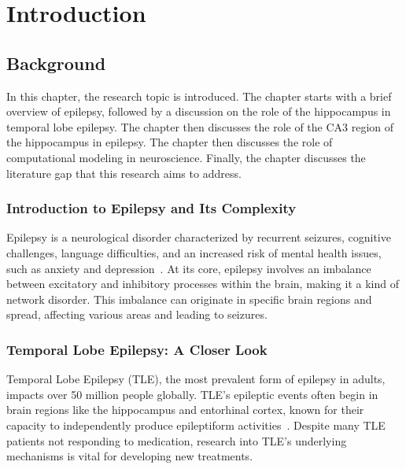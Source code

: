 \chapter{Introduction}


\section{Background}
In this chapter, the research topic is introduced. 
The chapter starts with a brief overview of epilepsy, followed by a discussion on the role of the hippocampus in temporal lobe epilepsy. 
The chapter then discusses the role of the CA3 region of the hippocampus in epilepsy. 
The chapter then discusses the role of computational modeling in neuroscience. 
Finally, the chapter discusses the literature gap that this research aims to address.

\subsection{Introduction to Epilepsy and Its Complexity}
Epilepsy is a neurological disorder characterized by recurrent seizures, cognitive 
challenges, language difficulties, and an increased risk of mental health issues, 
such as anxiety and depression~\parencite{fisherILAEOfficialReport2014}. At its core, epilepsy 
involves an imbalance between excitatory and inhibitory processes within the brain, 
making it a kind of network disorder. This imbalance can originate in specific brain 
regions and spread, affecting various areas and leading to seizures.

\subsection{Temporal Lobe Epilepsy: A Closer Look}
Temporal Lobe Epilepsy (TLE), the most prevalent form of epilepsy in adults, 
impacts over 50 million people globally. TLE's epileptic events often begin in 
brain regions like the hippocampus and entorhinal cortex, known for their 
capacity to independently produce epileptiform activities~\parencite{lyttonComputerSimulationEpilepsy2005}.
Despite many TLE patients not responding to medication, research into TLE's 
underlying mechanisms is vital for developing new treatments.

